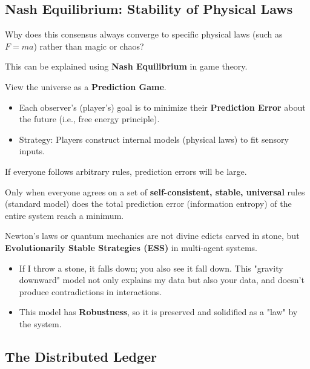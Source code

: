 \subsection{Nash Equilibrium: Stability of Physical Laws}

Why does this consensus always converge to specific physical laws (such as $F=ma$) rather than magic or chaos?

This can be explained using \textbf{Nash Equilibrium} in game theory.

View the universe as a \textbf{Prediction Game}.

\begin{itemize}
\item Each observer's (player's) goal is to minimize their \textbf{Prediction Error} about the future (i.e., free energy principle).

\item Strategy: Players construct internal models (physical laws) to fit sensory inputs.
\end{itemize}

If everyone follows arbitrary rules, prediction errors will be large.

Only when everyone agrees on a set of \textbf{self-consistent, stable, universal} rules (standard model) does the total prediction error (information entropy) of the entire system reach a minimum.

\begin{corollary}
Newton's laws or quantum mechanics are not divine edicts carved in stone, but \textbf{Evolutionarily Stable Strategies (ESS)} in multi-agent systems.

\begin{itemize}
\item If I throw a stone, it falls down; you also see it fall down. This "gravity downward" model not only explains my data but also your data, and doesn't produce contradictions in interactions.

\item This model has \textbf{Robustness}, so it is preserved and solidified as a "law" by the system.
\end{itemize}
\end{corollary}

\subsection{The Distributed Ledger}

